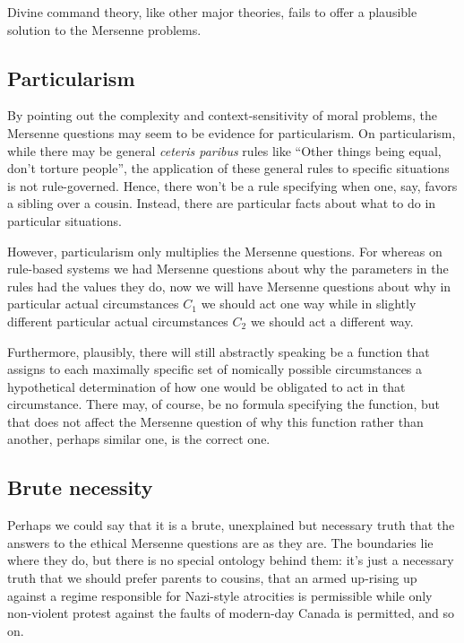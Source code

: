 Divine command theory, like other major theories, fails to offer a plausible solution to the Mersenne problems.

\subsection{Particularism}
By pointing out the complexity and context-sensitivity of moral problems, the Mersenne questions may seem to be
evidence for particularism. On particularism, while there may be general \textit{ceteris paribus} rules
like ``Other things being equal, don't torture people'', the application of these general rules to specific situations is not
rule-governed. Hence, there won't be a rule specifying when one, say, favors a sibling over a cousin. Instead, there are 
particular facts about what to do in particular situations. 

However, particularism only multiplies the Mersenne questions. For whereas on rule-based systems we had Mersenne questions
about why the parameters in the rules had the values they do, now we will have Mersenne questions about why in particular actual
circumstances $C_1$ we should act one way while in slightly different particular actual circumstances $C_2$ we should act a
different way.

Furthermore, plausibly, there will still abstractly speaking be a function that assigns to each maximally
specific set of nomically possible circumstances a hypothetical determination
of how one would be obligated to act in that circumstance.
There may, of course, be no formula specifying the function, but that does not
affect the Mersenne question of why this function rather than another, perhaps similar one, is the correct one.

\subsection{Brute necessity}\label{sec:brute}
Perhaps we could say that it is a brute, unexplained but necessary truth that the answers to the ethical Mersenne questions are as they are.
The boundaries lie where they do, but there is no special ontology behind them: it's just a necessary truth that we should prefer parents to cousins,
that an armed up-rising up against a regime responsible for Nazi-style atrocities is permissible while only non-violent protest against the
faults of modern-day Canada is permitted, and so on. 

